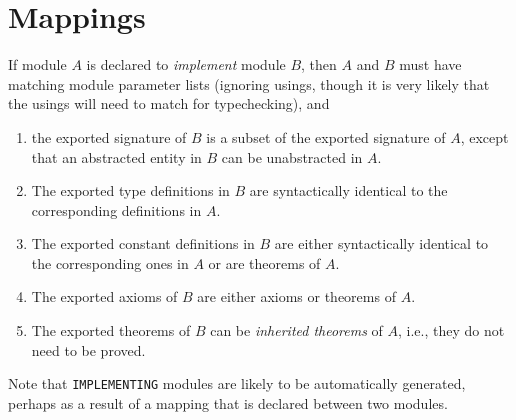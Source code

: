 \chapter{Mappings}

If module $A$ is declared to {\em implement\/} module $B$, then 
$A$ and $B$ must have matching module parameter lists (ignoring
usings, though it is very likely that the usings will need to match
for typechecking), and
\begin{enumerate}
  \item the exported signature of $B$ is a subset of the exported
signature of $A$, except that an abstracted entity in $B$ can be
unabstracted in $A$.
 \item The exported type definitions in $B$ are syntactically identical
to the corresponding definitions in $A$.
 \item The exported constant definitions in $B$ are either syntactically
identical to the corresponding ones in $A$ or are theorems of $A$.
 \item The exported axioms of $B$ are either axioms or theorems of $A$.
  \item The exported theorems of $B$ can be {\em inherited theorems\/} of
$A$, i.e., they do not need to be proved.  
\end{enumerate}

Note that {\tt IMPLEMENTING} modules are likely to be automatically
generated, perhaps as a result of a mapping that is declared between two
modules.  
